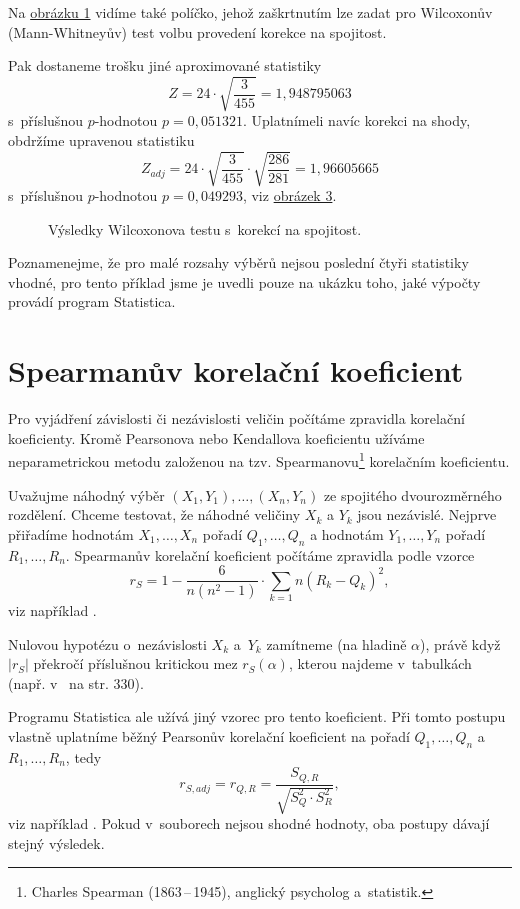 Na \hyperref[obrazek1]{obrázku 1} vidíme také políčko, jehož zaškrtnutím lze zadat pro Wilcoxonův (Mann-Whitneyův) test volbu provedení korekce na spojitost.


Pak dostaneme trošku jiné aproximované statistiky
  $$Z=24\cdot \sqrt{ \frac{3}{455}} =1{,}948795063 $$
  s~příslušnou $p$-hodnotou $p=0{,}051321$. Uplatníme\z li navíc korekci na shody, obdržíme upravenou statistiku
  $$Z_{adj}=24\cdot \sqrt{ \frac{3}{455}}\cdot \sqrt{\frac{286}{281}} =1{,}96605665 $$
  s~příslušnou $p$-hodnotou $p=0{,}049293$, viz \hyperref[obrazek3]{obrázek 3}.

\begin{figure}[!bht]
\caption{Výsledky Wilcoxonova testu s~korekcí na spojitost.}
\label{obrazek3}
\end{figure}

 Poznamenejme, že pro malé rozsahy výběrů nejsou poslední čtyři statistiky vhodné, pro tento příklad jsme je uvedli pouze na ukázku toho, jaké výpočty provádí program Statistica.


\section{Spearmanův korelační koeficient}

Pro vyjádření závislosti či nezávislosti veličin počítáme zpravidla korelační koeficienty. Kromě Pearsonova nebo Kendallova koeficientu užíváme neparametrickou metodu založenou
na tzv. Spearmanovu\footnote{Charles Spearman (1863\,--\,1945), anglický psycholog a~statistik.}
 korelačním koeficientu.

Uvažujme náhodný výběr $(X_{1},Y_{1}),\dots,(X_{n},Y_{n})$ ze spojitého dvourozměrného rozdělení. Chceme testovat, že náhodné veličiny $X_k$ a $Y_k$ jsou nezávislé.
Nejprve přiřadíme  hodnotám $X_1,\dots, X_n$ pořadí $Q_1,\dots, Q_n$ a
 hodnotám $Y_1,\dots, Y_n$  pořadí $R_1,\dots, R_n$. Spearmanův korelační koeficient počítáme zpravidla podle vzorce
$$ r_S=1-\frac6{n(n^2-1)}\cdot \sum_{k=1}n (R_k-Q_k)^2 ,$$
viz například \cite{1,2,9}.

 Nulovou hypotézu o~nezávislosti $X_k$ a~$Y_k$  zamítneme (na hladině $\alpha$), právě když
$ |r_S| $ překročí příslušnou kritickou mez $r_S(\alpha)$, kterou najdeme v~tabulkách (např. v~\cite{1} na str. 330).

Programu Statistica ale užívá jiný vzorec pro tento koeficient. Při tomto postupu vlastně uplatníme běžný Pearsonův korelační koeficient na pořadí $Q_1,\dots, Q_n$ a~$R_1,\dots, R_n$, tedy
$$r_{S, adj}= r_{Q,R}=\frac{S_{Q,R}}{\sqrt{ S_Q^2 \cdot S_R^2}} ,$$
viz například \cite{3}.
Pokud v~souborech nejsou shodné hodnoty, oba postupy dávají stejný výsledek.

